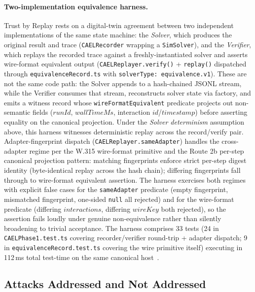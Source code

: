 \documentclass[letterpaper,twocolumn,10pt]{article}
\begin{document}
\paragraph{Two-implementation equivalence harness.}
Trust by Replay rests on a digital-twin agreement between two
independent implementations of the same state machine: the
\emph{Solver}, which produces the original result and trace
(\texttt{CAELRecorder} wrapping a \texttt{SimSolver}), and the
\emph{Verifier}, which replays the recorded trace against a
freshly-instantiated solver and asserts wire-format equivalent
output (\texttt{CAELReplayer.verify()} +
\texttt{replay()} dispatched through \texttt{equivalenceRecord.ts}
with \texttt{solverType: equivalence.v1}). These are not the same
code path: the Solver appends to a hash-chained JSONL stream, while
the Verifier consumes that stream, reconstructs solver state via
factory, and emits a witness record whose \texttt{wireFormatEquivalent}
predicate projects out non-semantic fields ($runId$, $wallTimeMs$,
interaction $id$/$timestamp$) before asserting equality on the
canonical projection. Under the \emph{Solver determinism} assumption
above, this harness witnesses deterministic replay across the
record/verify pair. Adapter-fingerprint dispatch
(\texttt{CAELReplayer.sameAdapter}) handles the cross-adapter regime
per the W.315 wire-format primitive and the Route 2b per-step
canonical projection pattern: matching fingerprints enforce strict
per-step digest identity (byte-identical replay across the hash
chain); differing fingerprints fall through to wire-format
equivalent assertion. The harness exercises both regimes with
explicit false cases for the \texttt{sameAdapter} predicate
(empty fingerprint, mismatched fingerprint, one-sided \texttt{null}
all rejected) and for the wire-format predicate (differing
$interactions$, differing $wireKey$ both rejected), so the assertion
fails loudly under genuine non-equivalence rather than silently
broadening to trivial acceptance. The harness comprises 33 tests
(24 in \texttt{CAELPhase1.test.ts} covering recorder/verifier
round-trip + adapter dispatch; 9 in \texttt{equivalenceRecord.test.ts}
covering the wire primitive itself) executing in 112\,ms total
test-time on the same canonical
host~\cite{paper-0c-twin-test-2026-05-11}.

\subsection{Attacks Addressed and Not Addressed}
\end{document}
